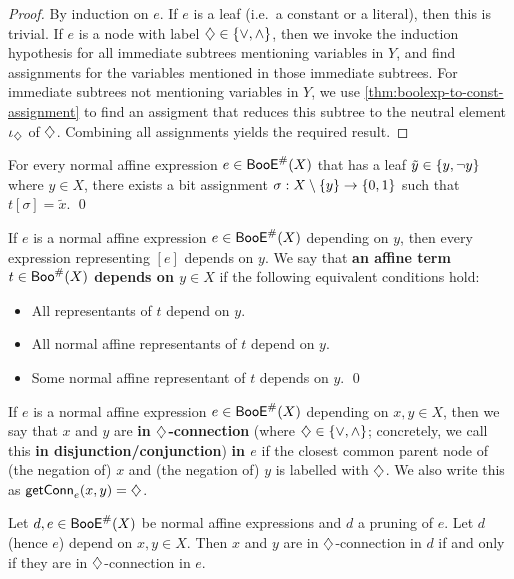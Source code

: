 \documentclass[a4paper]{memoir}
\begin{document}
\begin{proof}
	By induction on $e$.
	If $e$ is a leaf (i.e.\ a constant or a literal), then this is trivial.
	If $e$ is a node with label $\mathbin{\diamondsuit} \in \mathopen{}\left\{ {\vee}, {\wedge} \right\}\mathclose{}$, then we invoke the induction hypothesis for all immediate subtrees mentioning variables in $Y$, and find assignments for the variables mentioned in those immediate subtrees.
	For immediate subtrees not mentioning variables in $Y$, we use \cref{thm:boolexp-to-const-assignment} to find an assigment that reduces this subtree to the neutral element $\iota_{\mathbin{\diamondsuit}}$ of $\mathbin{\diamondsuit}$.
	Combining all assignments yields the required result.
\end{proof}
\begin{corollary} \label{thm:boolexp-to-var-assignment}
	For every normal affine expression $e \in \mathsf{BooE}^\#(X)$ that has a leaf $\tilde y \in \mathopen{}\left\{ y,\lnot y \right\}\mathclose{}$ where $y \in X$, there exists a bit assignment $\sigma : X \setminus \mathopen{}\left\{ y \right\}\mathclose{} \to \mathopen{}\left\{ 0, 1 \right\}\mathclose{}$ such that $t[\sigma] = \tilde x$. \qed
\end{corollary}
\begin{corollary} \label{thm:bool:term-dependencies}
	If $e$ is a normal affine expression $e \in \mathsf{BooE}^\#(X)$ depending on $y$, then every expression representing $[e]$ depends on $y$.
	We say that \textbf{an affine term $t \in \mathsf{Boo}^\#(X)$ depends on $y \in X$} if the following equivalent conditions hold:
	\begin{itemize}
		\item All representants of $t$ depend on $y$.
		\item All normal affine representants of $t$ depend on $y$.
		\item Some normal affine representant of $t$ depends on $y$. \qed
	\end{itemize}
\end{corollary}
\begin{definition} \label{def:bool:in-connection}
	If $e$ is a normal affine expression $e \in \mathsf{BooE}^\#(X)$ depending on $x, y \in X$, then we say that $x$ and $y$ are \textbf{in $\mathbin{\diamondsuit}$-connection} (where $\mathbin{\diamondsuit} \in \mathopen{}\left\{ {\vee}, {\wedge} \right\}\mathclose{}$; concretely, we call this \textbf{in disjunction/conjunction}) \textbf{in $e$} if the closest common parent node of (the negation of) $x$ and (the negation of) $y$ is labelled with $\mathbin{\diamondsuit}$.
	We also write this as $\mathsf{getConn}_{e}(x, y) = {\mathbin{\diamondsuit}}$.
\end{definition}
\begin{lemma} \label{thm:bool:pruning-in-connection}
	Let $d, e \in \mathsf{BooE}^\#(X)$ be normal affine expressions and $d$ a pruning of $e$.
	Let $d$ (hence $e$) depend on $x, y \in X$.
	Then $x$ and $y$ are in $\mathbin{\diamondsuit}$-connection in $d$ if and only if they are in $\mathbin{\diamondsuit}$-connection in $e$.
\end{lemma}
\end{document}
